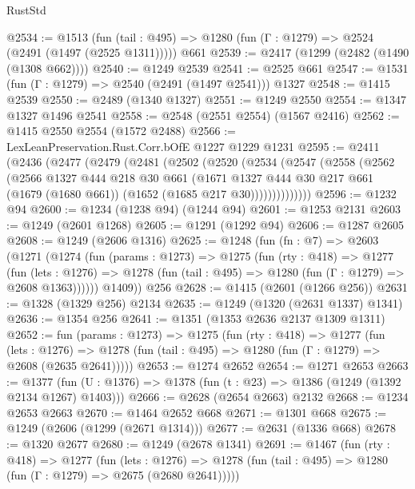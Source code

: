\begin{lexlean}{RustStd}
\begin{coremodule}
@2534 := @1513
    (fun (tail : @495) => @1280 (fun (Γ : @1279) => @2524 (@2491 (@1497 (@2525 @1311)))))
    @661
@2539 := @2417 (@1299 (@2482 (@1490 (@1308 @662))))
@2540 := @1249 @2539
@2541 := @2525 @661
@2547 := @1531 (fun (Γ : @1279) => @2540 (@2491 (@1497 @2541))) @1327
@2548 := @1415 @2539
@2550 := @2489 (@1340 @1327)
@2551 := @1249 @2550
@2554 := @1347 @1327 @1496 @2541
@2558 := @2548 (@2551 @2554) (@1567 @2416)
@2562 := @1415 @2550 @2554 (@1572 @2488)
@2566 := LexLeanPreservation.Rust.Corr.bOfE @1227 @1229 @1231
@2595 := @2411
    (@2436
      (@2477
        (@2479
          (@2481
            (@2502
              (@2520
                (@2534
                  (@2547
                    (@2558
                      (@2562
                        (@2566
                          @1327
                          @444
                          @218
                          @30
                          @661
                          (@1671
                            @1327
                            @444
                            @30
                            @217
                            @661
                            (@1679 (@1680 @661))
                            (@1652 (@1685 @217 @30))))))))))))))
@2596 := @1232 @94
@2600 := @1234 (@1238 @94) (@1244 @94)
@2601 := @1253 @2131
@2603 := @1249 (@2601 @1268)
@2605 := @1291 (@1292 @94)
@2606 := @1287 @2605
@2608 := @1249 (@2606 @1316)
@2625 := @1248
    (fun (fn : @7) =>
    @2603
      (@1271
        (@1274
          (fun (params : @1273) =>
          @1275
            (fun (rty : @418) =>
            @1277
              (fun (lets : @1276) =>
              @1278 (fun (tail : @495) => @1280 (fun (Γ : @1279) => @2608 @1363))))))
        @1409))
    @256
@2628 := @1415 (@2601 (@1266 @256))
@2631 := @1328 (@1329 @256) @2134
@2635 := @1249 (@1320 (@2631 @1337) @1341)
@2636 := @1354 @256
@2641 := @1351 (@1353 @2636 @2137 @1309 @1311)
@2652 := fun (params : @1273) =>
  @1275
    (fun (rty : @418) =>
    @1277
      (fun (lets : @1276) =>
      @1278 (fun (tail : @495) => @1280 (fun (Γ : @1279) => @2608 (@2635 @2641)))))
@2653 := @1274 @2652
@2654 := @1271 @2653
@2663 := @1377 (fun (U : @1376) => @1378 (fun (t : @23) => @1386 (@1249 (@1392 @2134 @1267) @1403)))
@2666 := @2628 (@2654 @2663) @2132
@2668 := @1234 @2653 @2663
@2670 := @1464 @2652 @668
@2671 := @1301 @668
@2675 := @1249 (@2606 (@1299 (@2671 @1314)))
@2677 := @2631 (@1336 @668)
@2678 := @1320 @2677
@2680 := @1249 (@2678 @1341)
@2691 := @1467
    (fun (rty : @418) =>
    @1277
      (fun (lets : @1276) =>
      @1278 (fun (tail : @495) => @1280 (fun (Γ : @1279) => @2675 (@2680 @2641)))))

\end{coremodule}
\end{lexlean}

